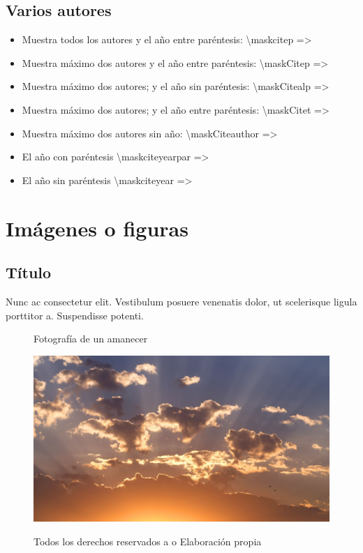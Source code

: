 \documentclass[stu, 12pt, letterpaper, donotrepeattitle, floatsintext, natbib]{apa7}
\begin{document}
\subsection{Varios autores}
\begin{itemize}
    \item Muestra todos los autores y el año entre paréntesis: \textbackslash maskcitep => 
    \item Muestra máximo dos autores y el año entre paréntesis: \textbackslash maskCitep => 
    \item Muestra máximo dos autores; y el año sin paréntesis: \textbackslash maskCitealp => 
    \item Muestra máximo dos autores; y el año entre paréntesis: \textbackslash maskCitet =>  
    \item Muestra máximo dos autores sin año: \textbackslash maskCiteauthor => 
    \item El año con paréntesis \textbackslash maskciteyearpar => 
    \item El año sin paréntesis \textbackslash maskciteyear => 
\end{itemize}
\newpage


\section{Imágenes o figuras}
\subsection{Título} 
Nunc ac consectetur elit. Vestibulum posuere venenatis dolor, ut scelerisque ligula porttitor a. Suspendisse potenti.\par
\begin{figure}[h]
\caption{Fotografía de un amanecer}
\includegraphics[scale=0.2]{sunset.jpg}
\centering
\label{fig:amanecer}
\caption*{Todos los derechos reservados a   o Elaboración propia}
\end{figure}
\end{document}
